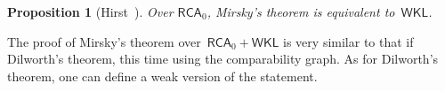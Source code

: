 \documentclass{article}
\def\P{\mathcal{P}}
\def\G{\mathcal{G}}
\newcommand{\RCA}[0]{\mathsf{RCA}}
\newcommand{\WKL}[0]{\mathsf{WKL}}
\newcommand{\NN}[0]{\mathbb{N}}
\numberwithin{theorem}{section}
\newtheorem{proposition}[theorem]{Proposition}
\begin{document}
\begin{proposition}[{Hirst~\cite[Theorem 3.24]{hirst1987combinatorics}}]
Over $\RCA_0$, Mirsky's theorem is equivalent to~$\WKL$.
\end{proposition}

The proof of Mirsky's theorem over~$\RCA_0 + \WKL$ is very similar to that if Dilworth's theorem, this time using the comparability graph. As for Dilworth's theorem, one can define a weak version of the statement.





\end{document}
